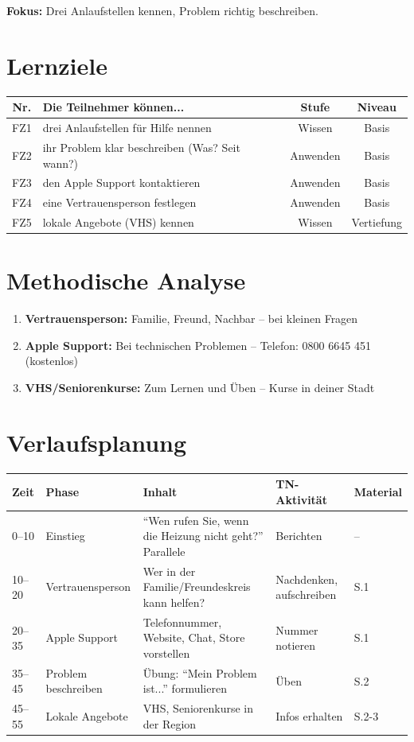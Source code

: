\documentclass[11pt,a4paper]{article}
\begin{document}
\textbf{Fokus:} Drei Anlaufstellen kennen, Problem richtig beschreiben.

\section{Lernziele}

\begin{tabular}{|c|p{7cm}|c|c|}
\hline
\textbf{Nr.} & \textbf{Die Teilnehmer können...} & \textbf{Stufe} & \textbf{Niveau} \\
\hline
FZ1 & drei Anlaufstellen für Hilfe nennen & Wissen & Basis \\
FZ2 & ihr Problem klar beschreiben (Was? Seit wann?) & Anwenden & Basis \\
FZ3 & den Apple Support kontaktieren & Anwenden & Basis \\
FZ4 & eine Vertrauensperson festlegen & Anwenden & Basis \\
FZ5 & lokale Angebote (VHS) kennen & Wissen & Vertiefung \\
\hline
\end{tabular}

\section{Methodische Analyse}

\begin{infobox}
\begin{enumerate}
    \item \textbf{Vertrauensperson:} Familie, Freund, Nachbar -- bei kleinen Fragen
    \item \textbf{Apple Support:} Bei technischen Problemen -- Telefon: 0800 6645 451 (kostenlos)
    \item \textbf{VHS/Seniorenkurse:} Zum Lernen und Üben -- Kurse in deiner Stadt
\end{enumerate}
\end{infobox}

\section{Verlaufsplanung}

\begin{longtable}{|p{1cm}|p{2cm}|p{5cm}|p{3cm}|p{2cm}|}
\hline
\textbf{Zeit} & \textbf{Phase} & \textbf{Inhalt} & \textbf{TN-Aktivität} & \textbf{Material} \\
\hline
0--10 & Einstieg & ``Wen rufen Sie, wenn die Heizung nicht geht?'' Parallele & Berichten & -- \\
\hline
10--20 & Vertrauensperson & Wer in der Familie/Freundeskreis kann helfen? & Nachdenken, aufschreiben & S.1 \\
\hline
20--35 & Apple Support & Telefonnummer, Website, Chat, Store vorstellen & Nummer notieren & S.1 \\
\hline
35--45 & Problem beschreiben & Übung: ``Mein Problem ist...'' formulieren & Üben & S.2 \\
\hline
45--55 & Lokale Angebote & VHS, Seniorenkurse in der Region & Infos erhalten & S.2-3 \\
\hline
\end{longtable}
\end{document}
